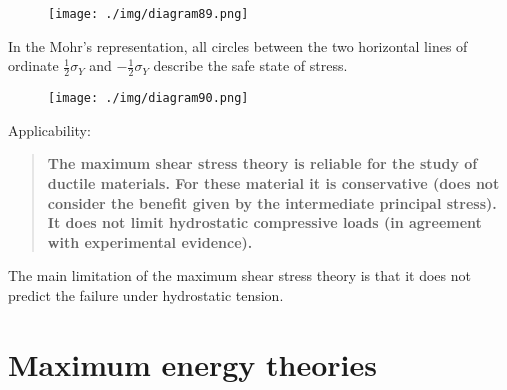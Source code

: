 \begin{figure}[H]
  \centering
  \texttt{[image: ./img/diagram89.png]}
  \caption{}
\end{figure}
In the Mohr's representation, all circles between the two horizontal lines of ordinate $\frac{1}{2}\sigma_Y$ and $-\frac{1}{2}\sigma_Y$ describe the safe state of stress.
\begin{figure}[H]
  \centering
  \texttt{[image: ./img/diagram90.png]}
  \caption{}
\end{figure}
Applicability:
\begin{quotation}
  \textbf{The maximum shear stress theory is reliable for the study of ductile materials. For these material it is conservative (does not consider the benefit given by the intermediate principal stress). It does not limit hydrostatic compressive loads (in agreement with experimental evidence).}
\end{quotation}
The main limitation of the maximum shear stress theory is that it does not predict the failure under hydrostatic tension.
\section{Maximum energy theories}
